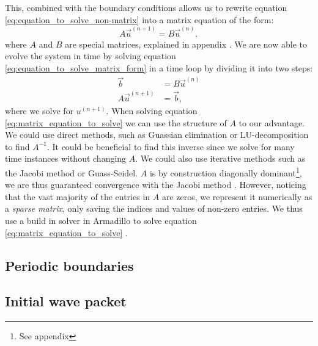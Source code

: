         This, combined with the boundary conditions allows us to rewrite equation \eqref{eq:equation_to_solve_non-matrix} into a matrix equation of the form:
        \begin{equation}\label{eq:equation_to_solve_matrix_form}
            A\vec{u}^{(n+1)} = B\vec{u}^{(n)},
        \end{equation}
        where $A$ and $B$ are special matrices, explained in appendix . 
        We are now able to evolve the system in time by solving equation \eqref{eq:equation_to_solve_matrix_form} in a time loop by dividing it into two steps:
        \begin{equation}\label{eq:matrix_equation_to_solve}
            \begin{split}
                \vec{b} &= B\vec{u}^{(n)} \\
                A\vec{u}^{(n+1)} &= \vec{b},
            \end{split}
        \end{equation}
        where we solve for $u^{(n+1)}$. When solving equation \eqref{eq:matrix_equation_to_solve} we can use the structure of $A$ to our advantage. We could use direct methods, such as Guassian elimination or LU-decomposition to find $A^{-1}$. It could be beneficial to find this inverse since we solve for many time instances without changing $A$. We could also use iterative methods such as the Jacobi method or Guass-Seidel. $A$ is by construction diagonally dominant\footnote{See appendix }, we are thus guaranteed convergence with the Jacobi method . However, noticing that the vast majority of the entries in $A$ are zeros, we represent it numerically as a \textit{sparse matrix}, only saving the indices and values of non-zero entries. We thus use a build in solver in Armadillo to solve equation \eqref{eq:matrix_equation_to_solve} \citep{lecture_notes}.

\subsection{Periodic boundaries}\label{sec:method:periodic_boundaries}

\subsection{Initial wave packet}\label{sec:method:initial_wave}


